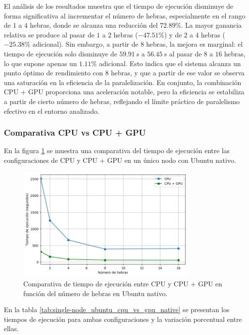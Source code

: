 El análisis de los resultados muestra que el tiempo de ejecución disminuye de forma significativa al incrementar el número de hebras, especialmente en el rango de $1$ a $4$ hebras, donde se alcanza una reducción del $72.89\%$. La mayor ganancia relativa se produce al pasar de $1$ a $2$ hebras ($-47.51\%$) y de $2$ a $4$ hebras ($-25.38\%$ adicional). Sin embargo, a partir de $8$ hebras, la mejora es marginal: el tiempo de ejecución solo disminuye de $59.91\,s$ a $56.45\,s$ al pasar de $8$ a $16$ hebras, lo que supone apenas un $1.11\%$ adicional. Esto indica que el sistema alcanza un punto óptimo de rendimiento con $8$ hebras, y que a partir de ese valor se observa una saturación en la eficiencia de la paralelización. En conjunto, la combinación CPU + GPU proporciona una aceleración notable, pero la eficiencia se estabiliza a partir de cierto número de hebras, reflejando el límite práctico de paralelismo efectivo en el entorno analizado.

\subsubsection{Comparativa CPU vs CPU + GPU}

En la figura \ref{fig:single-node_ubuntu_cpu_vs_gpu_native_time} se muestra una comparativa del tiempo de ejecución entre las configuraciones de CPU y CPU + GPU en un único nodo con Ubuntu nativo.

\begin{figure}[H]
    \centering
    \includegraphics[width=0.8\textwidth]{imagenes/cap5/single-node_ubuntu_cpu_vs_gpu_native_time.png}
    \caption{Comparativa de tiempo de ejecución entre CPU y CPU + GPU en función del número de hebras en Ubuntu nativo.}
    \label{fig:single-node_ubuntu_cpu_vs_gpu_native_time}
\end{figure}

En la tabla \ref{tab:single-node_ubuntu_cpu_vs_gpu_native} se presentan los tiempos de ejecución para ambas configuraciones y la variación porcentual entre ellas.

